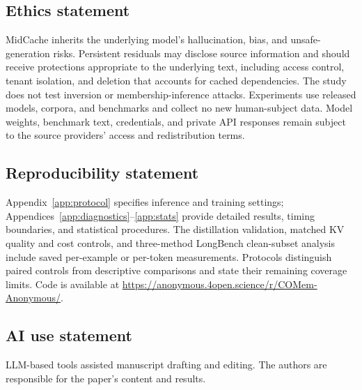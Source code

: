 \subsection*{Ethics statement}
MidCache inherits the underlying model's hallucination, bias, and unsafe-generation risks. Persistent residuals may disclose source information and should receive protections appropriate to the underlying text, including access control, tenant isolation, and deletion that accounts for cached dependencies. The study does not test inversion or membership-inference attacks. Experiments use released models, corpora, and benchmarks and collect no new human-subject data. Model weights, benchmark text, credentials, and private API responses remain subject to the source providers' access and redistribution terms.

\subsection*{Reproducibility statement}
Appendix~\ref{app:protocol} specifies inference and training settings; Appendices~\ref{app:diagnostics}--\ref{app:stats} provide detailed results, timing boundaries, and statistical procedures. The distillation validation, matched KV quality and cost controls, and three-method LongBench clean-subset analysis include saved per-example or per-token measurements. Protocols distinguish paired controls from descriptive comparisons and state their remaining coverage limits. Code is available at \url{https://anonymous.4open.science/r/COMem-Anonymous/}.

\subsection*{AI use statement}
LLM-based tools assisted manuscript drafting and editing. The authors are responsible for the paper's content and results.
